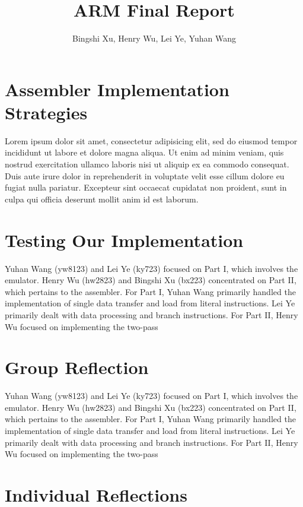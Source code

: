 \documentclass[11pt]{article}
\begin{document}
\title{ARM Final Report}
\author{Bingshi Xu, Henry Wu, Lei Ye, Yuhan Wang}

\maketitle

\section{Assembler Implementation Strategies}

Lorem ipsum dolor sit amet, consectetur adipisicing elit, sed do eiusmod tempor
incididunt ut labore et dolore magna aliqua. Ut enim ad minim veniam, quis
nostrud exercitation ullamco laboris nisi ut aliquip ex ea commodo consequat.
Duis aute irure dolor in reprehenderit in voluptate velit esse cillum dolore eu
fugiat nulla pariatur. Excepteur sint occaecat cupidatat non proident, sunt in
culpa qui officia deserunt mollit anim id est laborum.

\section{Testing Our Implementation}

Yuhan Wang (yw8123) and Lei Ye (ky723) focused on Part I, which involves the emulator. Henry Wu (hw2823) and Bingshi Xu (bx223) concentrated on Part II, which pertains to the assembler.
For Part I, Yuhan Wang primarily handled the implementation of single data transfer and load from literal instructions. Lei Ye primarily dealt with data processing and branch instructions.
For Part II, Henry Wu focused on implementing the two-pass 

\section{Group Reflection}

Yuhan Wang (yw8123) and Lei Ye (ky723) focused on Part I, which involves the emulator. Henry Wu (hw2823) and Bingshi Xu (bx223) concentrated on Part II, which pertains to the assembler.
For Part I, Yuhan Wang primarily handled the implementation of single data transfer and load from literal instructions. Lei Ye primarily dealt with data processing and branch instructions.
For Part II, Henry Wu focused on implementing the two-pass 

\section{Individual Reflections}
\end{document}

